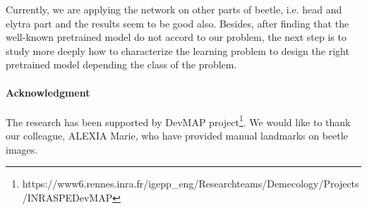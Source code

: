 \documentclass{article} %
\begin{document}
\begin{multicols}{2}
Currently, we are applying the network on other parts of beetle, i.e. head and elytra part and the results seem to be good also. Besides, after finding that the well-known pretrained model do not accord to our problem, the next step is to study more deeply how to characterize the learning problem to design the right pretrained model depending the class of the problem.

\paragraph{Acknowledgment}

The research has been supported by DevMAP project\footnote{https://www6.rennes.inra.fr/igepp\_eng/Research\-teams/Demecology/Projects/INRA\-SPE\-DevMAP}. We would like to thank our colleague, ALEXIA Marie, who have provided manual landmarks on beetle images.

\footnotesize{




} 

\end{multicols}
\end{document}

